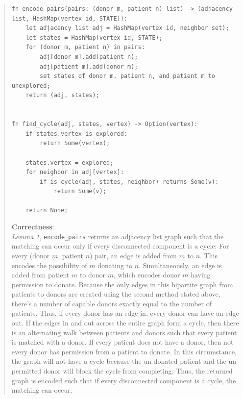 \documentclass[11pt]{article}
\begin{document}
\begin{enumerate}
\begin{enumerate}
\begin{quote}
\begin{verbatim}
fn encode_pairs(pairs: (donor m, patient n) list) -> (adjacency list, HashMap(vertex id, STATE)):
    let adjacency list adj = HashMap(vertex id, neighbor set);
    let states = HashMap(vertex id, STATE);
    for (donor m, patient n) in pairs:
        adj[donor m].add(patient n);
        adj[patient m].add(donor m);
        set states of donor m, patient n, and patient m to unexplored;
    return (adj, states);


fn find_cycle(adj, states, vertex) -> Option(vertex):
    if states.vertex is explored:
        return Some(vertex);

    states.vertex = explored;
    for neighbor in adj[vertex]:
        if is_cycle(adj, states, neighbor) returns Some(v):
            return Some(v);

    return None;
  \end{verbatim}

  \textbf{Correctness}: \\ 
  \textit{Lemma 1}, \texttt{encode\_pairs} returns an adjacency list graph such that the matching can occur only if every disconnected component is a cycle: For every (donor $m$, patient $n$) pair, an edge is added from $m$ to $n$. This encodes the possibility of $m$ donating to $n$. Simultaneously, an edge is added from patient $m$ to donor $m$, which encodes donor $m$ having permission to donate. Because the only edges in this bipartite graph from patients to donors are created using the second method stated above, there's a number of capable donors exactly equal to the number of patients. Thus, if every donor has an edge in, every donor can have an edge out. If the edges in and out across the entire graph form a cycle, then there is an alternating walk between patients and donors such that every patient is matched with a donor. If every patient does not have a donor, then not every donor has permission from a patient to donate. In this circumstance, the graph will not have a cycle because the un-donated patient and the un-permitted donor will block the cycle from completing. Thus, the returned graph is encoded such that if every disconnected component is a cycle, the matching can occur.  


\end{quote}
\end{enumerate}
\end{enumerate}
\end{document}
